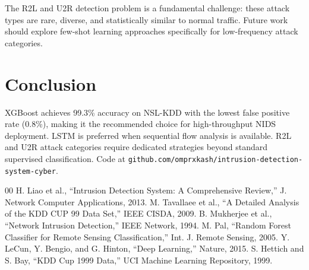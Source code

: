 \documentclass[conference]{IEEEtran}
\begin{document}
The R2L and U2R detection problem is a fundamental challenge: these attack types are rare, diverse, and statistically similar to normal traffic. Future work should explore few-shot learning approaches specifically for low-frequency attack categories.

\section{Conclusion}

XGBoost achieves 99.3\% accuracy on NSL-KDD with the lowest false positive rate (0.8\%), making it the recommended choice for high-throughput NIDS deployment. LSTM is preferred when sequential flow analysis is available. R2L and U2R attack categories require dedicated strategies beyond standard supervised classification. Code at \texttt{github.com/omprxkash/intrusion-detection-system-cyber}.

\begin{thebibliography}{00}
 H. Liao et al., ``Intrusion Detection System: A Comprehensive Review,'' J. Network Computer Applications, 2013.
 M. Tavallaee et al., ``A Detailed Analysis of the KDD CUP 99 Data Set,'' IEEE CISDA, 2009.
 B. Mukherjee et al., ``Network Intrusion Detection,'' IEEE Network, 1994.
 M. Pal, ``Random Forest Classifier for Remote Sensing Classification,'' Int. J. Remote Sensing, 2005.
 Y. LeCun, Y. Bengio, and G. Hinton, ``Deep Learning,'' Nature, 2015.
 S. Hettich and S. Bay, ``KDD Cup 1999 Data,'' UCI Machine Learning Repository, 1999.
\end{thebibliography}
\end{document}
